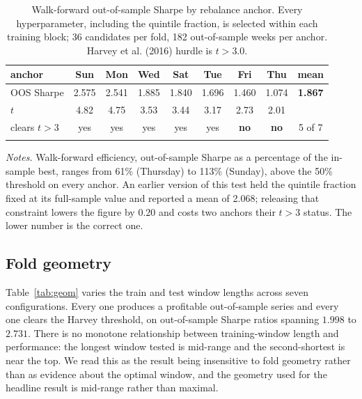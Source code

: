 \documentclass[11pt,letterpaper]{article}
\begin{document}
\begin{table}[!htbp]\centering
\caption{Walk-forward out-of-sample Sharpe by rebalance anchor. Every
hyperparameter, including the quintile fraction, is selected within each training
block; 36 candidates per fold, 182 out-of-sample weeks per anchor. Harvey et al.
(2016) hurdle is $t>3.0$.}
\label{tab:anchor}
\begin{tabular}{lccccccc|c}
\toprule
anchor & Sun & Mon & Wed & Sat & Tue & Fri & Thu & mean \\
\midrule\addlinespace[2pt]
OOS Sharpe & 2.575 & 2.541 & 1.885 & 1.840 & 1.696 & 1.460 & 1.074 & \textbf{1.867} \\
$t$ & 4.82 & 4.75 & 3.53 & 3.44 & 3.17 & 2.73 & 2.01 & \\
clears $t>3$ & yes & yes & yes & yes & yes & \textbf{no} & \textbf{no} & 5 of 7 \\
\addlinespace[2pt]
\bottomrule
\end{tabular}

\vspace{4pt}
\begin{minipage}{0.84\textwidth}\footnotesize
\emph{Notes.} Walk-forward efficiency, out-of-sample Sharpe as a percentage of
the in-sample best, ranges from 61\% (Thursday) to 113\% (Sunday), above the
50\% threshold on every anchor. An earlier version of this test held the quintile
fraction fixed at its full-sample value and reported a mean of 2.068; releasing
that constraint lowers the figure by 0.20 and costs two anchors their $t>3$
status. The lower number is the correct one.
\end{minipage}
\end{table}

\subsection{Fold geometry}

Table~\ref{tab:geom} varies the train and test window lengths across seven
configurations. Every one produces a profitable out-of-sample series and every
one clears the Harvey threshold, on out-of-sample Sharpe ratios spanning $1.998$
to $2.731$. There is no monotone relationship between training-window length and
performance: the longest window tested is mid-range and the second-shortest is
near the top. We read this as the result being insensitive to fold geometry
rather than as evidence about the optimal window, and the geometry used for the
headline result is mid-range rather than maximal.
\end{document}
